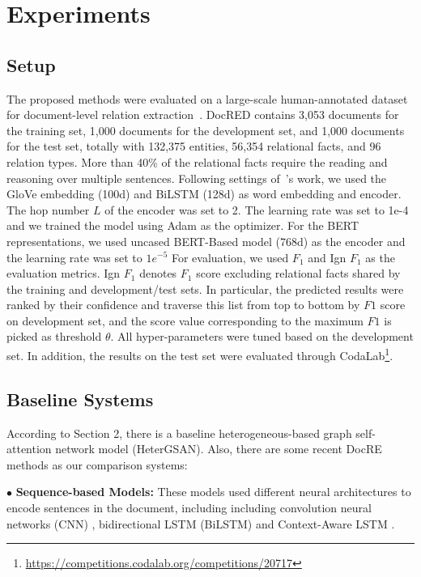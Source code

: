\documentclass[letterpaper]{article} \usepackage{aaai21}  \usepackage{times}  \usepackage{helvet} \usepackage{courier}  \usepackage[hyphens]{url}  \usepackage{graphicx} \urlstyle{rm} \def\UrlFont{\rm}  \usepackage{natbib}  \usepackage{caption} \frenchspacing  \setlength{\pdfpagewidth}{8.5in}  \setlength{\pdfpageheight}{11in}  \usepackage{amsmath}
\begin{document}
\section{Experiments}
\subsection{Setup}
The proposed methods were evaluated on a large-scale human-annotated dataset for document-level relation extraction~\cite{yao-etal-2019-docred}. 
DocRED contains 3,053 documents for the training set, 1,000 documents for the development set, and 1,000 documents for the test set, totally with 132,375 entities, 56,354 relational facts, and 96 relation types. 
More than 40\% of the relational facts require the reading and reasoning over multiple sentences.
Following settings of~\cite{Nan2020ReasoningWL}'s work, we used the GloVe embedding (100d) and BiLSTM (128d) as word embedding and encoder.
The hop number $L$ of the encoder was set to 2. 
The learning rate was set to 1e-4 and we trained the model using Adam as the optimizer.
For the BERT representations, we used uncased BERT-Based model (768d) as the encoder and the learning rate was set to $1e^{-5}$
For evaluation, we used $F_1$ and Ign $F_1$ as the evaluation metrics. 
Ign $F_1$ denotes $F_1$ score excluding relational facts shared by the training and development/test sets.
In particular, the predicted results were ranked by their confidence and traverse this list from top to bottom by $F1$ score on development set, and the score value corresponding to the maximum $F1$ is picked as threshold $\theta$.
All hyper-parameters were tuned based on the development set.
In addition, the results on the test set were evaluated through CodaLab\footnote{\url{https://competitions.codalab.org/competitions/20717}}.


\subsection{Baseline Systems}
According to Section 2, there is a baseline heterogeneous-based graph self-attention network model (HeterGSAN).
Also, there are some recent DocRE methods as our comparison systems:

$\bullet$  \textbf{Sequence-based Models:} 
These models used different neural architectures to encode sentences in the document, including including convolution neural networks (CNN) \cite{yao-etal-2019-docred}, bidirectional LSTM (BiLSTM) \cite{yao-etal-2019-docred} and Context-Aware LSTM \cite{yao-etal-2019-docred}.
\end{document}
